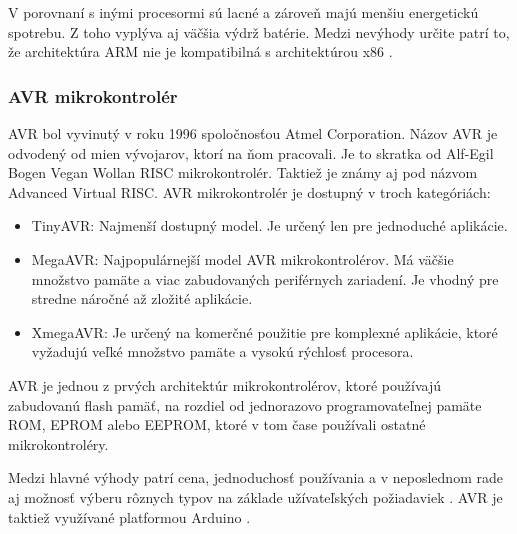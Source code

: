V porovnaní s inými procesormi sú lacné a zároveň majú menšiu energetickú spotrebu. Z toho vyplýva aj väčšia výdrž batérie.
Medzi nevýhody určite patrí to, že architektúra ARM nie je kompatibilná s architektúrou x86 \cite{shidlingDifferentTypesMicrocontrollers2020}.

\subsubsection{AVR mikrokontrolér}
\noindent \par
AVR bol vyvinutý v roku 1996 spoločnosťou Atmel Corporation. Názov AVR je odvodený od mien vývojarov, ktorí na ňom pracovali.
Je to skratka od  Alf-Egil Bogen Vegan Wollan RISC mikrokontrolér.
Taktiež je známy aj pod názvom Advanced Virtual RISC. AVR mikrokontrolér je dostupný v troch kategóriách:
\begin{itemize}
    \item TinyAVR: Najmenší dostupný model. Je určený len pre jednoduché aplikácie.
    \item MegaAVR: Najpopulárnejší model AVR mikrokontrolérov. Má väčšie množstvo pamäte a viac zabudovaných periférnych zariadení. Je vhodný pre stredne náročné až zložité aplikácie.
    \item XmegaAVR: Je určený na komerčné použitie pre komplexné aplikácie, ktoré vyžadujú veľké množstvo pamäte a vysokú rýchlosť procesora.
\end{itemize}

AVR je jednou z prvých architektúr mikrokontrolérov, ktoré používajú zabudovanú flash pamäť, na rozdiel od jednorazovo programovateľnej pamäte ROM, EPROM alebo EEPROM, ktoré v tom čase používali ostatné mikrokontroléry.
\par
Medzi hlavné výhody patrí cena, jednoduchosť používania a v neposlednom rade aj možnosť výberu rôznych typov na základe užívateľských požiadaviek \cite{shidlingDifferentTypesMicrocontrollers2020}. AVR je taktiež využívané platformou Arduino \cite{AVRVsArduinoWhich2017}.




